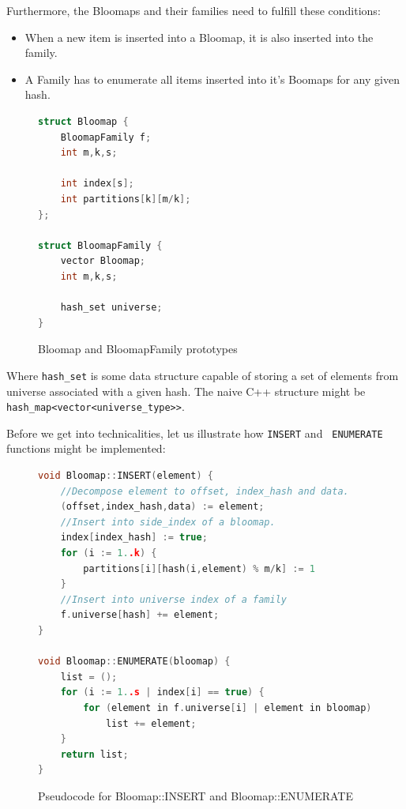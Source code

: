 Furthermore, the Bloomaps and their families need to fulfill these conditions:

\begin{itemize}
	\item When a new item is inserted into a Bloomap, it is also inserted into
		the family.
	\item A Family has to enumerate all items inserted into it's Boomaps for any
		given hash.
\end{itemize}

\begin{figure}[h!]
\begin{tcolorbox}
	\begin{lstlisting}[language=c++,tabsize=2]
struct Bloomap {
    BloomapFamily f;
    int m,k,s;

    int index[s];
    int partitions[k][m/k];
};

struct BloomapFamily {
    vector Bloomap;
    int m,k,s;

    hash_set universe;
}
\end{lstlisting}
\end{tcolorbox}
\caption{Bloomap and BloomapFamily prototypes}
\end{figure}

Where {\tt hash\_set} is some data structure capable of storing a set of
elements from universe associated with a given hash. The naive C++ structure
might be {\tt hash\_map<vector<universe\_type>>}.

Before we get into technicalities, let us illustrate how {\tt INSERT} and {\tt
ENUMERATE} functions might be implemented:

\begin{figure}[h!]
\begin{tcolorbox}
\begin{lstlisting}[language=c++,tabsize=2]
void Bloomap::INSERT(element) {
    //Decompose element to offset, index_hash and data.
    (offset,index_hash,data) := element;
    //Insert into side_index of a bloomap.
    index[index_hash] := true;
    for (i := 1..k) {
        partitions[i][hash(i,element) % m/k] := 1
    }
    //Insert into universe index of a family
    f.universe[hash] += element;
}

void Bloomap::ENUMERATE(bloomap) {
    list = ();
	for (i := 1..s | index[i] == true) {
        for (element in f.universe[i] | element in bloomap) 
            list += element;
    }
    return list;
}
\end{lstlisting}
\end{tcolorbox}
\caption{Pseudocode for Bloomap::INSERT and Bloomap::ENUMERATE}
\end{figure}


